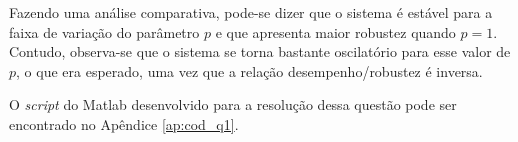 Fazendo uma análise comparativa, pode-se dizer que o sistema é estável para a
faixa de variação do parâmetro $p$ e que apresenta maior robustez quando $p =
1$. Contudo, observa-se que o sistema se torna bastante oscilatório para esse
valor de $p$, o que era esperado, uma vez que a relação desempenho/robustez é
inversa.

O {\it script} do Matlab\textupersript{\textregistered} desenvolvido para a
resolução dessa questão pode ser encontrado no Apêndice \ref{ap:cod_q1}.
